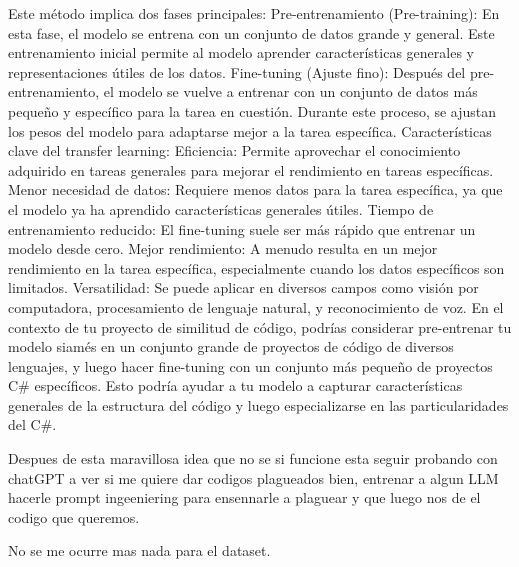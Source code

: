  Este método implica dos fases principales:
Pre-entrenamiento (Pre-training):
En esta fase, el modelo se entrena con un conjunto de datos grande y general. Este entrenamiento inicial permite al modelo aprender características generales y representaciones útiles de los datos.
Fine-tuning (Ajuste fino):
Después del pre-entrenamiento, el modelo se vuelve a entrenar con un conjunto de datos más pequeño y específico para la tarea en cuestión. Durante este proceso, se ajustan los pesos del modelo para adaptarse mejor a la tarea específica.
Características clave del transfer learning:
Eficiencia: Permite aprovechar el conocimiento adquirido en tareas generales para mejorar el rendimiento en tareas específicas.
Menor necesidad de datos: Requiere menos datos para la tarea específica, ya que el modelo ya ha aprendido características generales útiles.
Tiempo de entrenamiento reducido: El fine-tuning suele ser más rápido que entrenar un modelo desde cero.
Mejor rendimiento: A menudo resulta en un mejor rendimiento en la tarea específica, especialmente cuando los datos específicos son limitados.
Versatilidad: Se puede aplicar en diversos campos como visión por computadora, procesamiento de lenguaje natural, y reconocimiento de voz.
En el contexto de tu proyecto de similitud de código, podrías considerar pre-entrenar tu modelo siamés en un conjunto grande de proyectos de código de diversos lenguajes, y luego hacer fine-tuning con un conjunto más pequeño de proyectos C# específicos. Esto podría ayudar a tu modelo a capturar características generales de la estructura del código y luego especializarse en las particularidades del C#.

Despues de esta maravillosa idea que no se si funcione esta seguir probando con chatGPT a ver si me quiere dar codigos plagueados bien, entrenar a algun LLM hacerle prompt ingeeniering para ensennarle a plaguear y que luego nos de el codigo que queremos.

No se me ocurre mas nada para el dataset.

